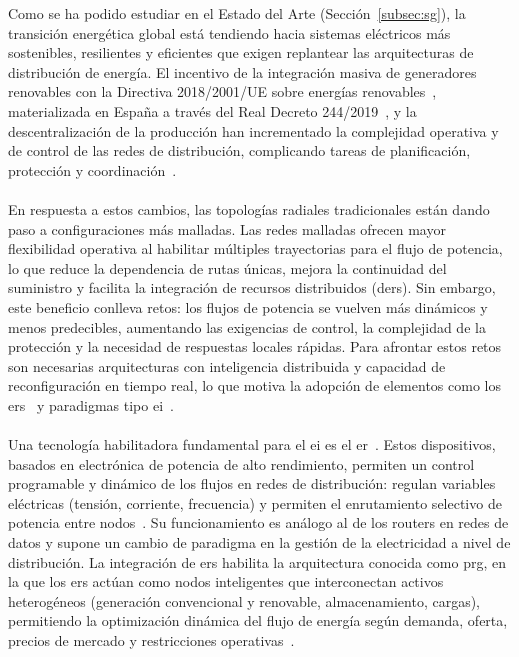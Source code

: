 Como se ha podido estudiar en el Estado del Arte (Sección~\ref{subsec:sg}), la transición energética global está tendiendo hacia sistemas eléctricos más sostenibles, resilientes y eficientes que exigen replantear las arquitecturas de distribución de energía. El incentivo de la integración masiva de generadores renovables con la Directiva 2018/2001/UE sobre energías renovables~\cite{euREDII},  materializada en España a través del Real Decreto 244/2019~\cite{rd2442019}, y la descentralización de la producción han incrementado la complejidad operativa y de control de las redes de distribución, complicando tareas de planificación, protección y coordinación~\cite{GADELHA2024110581}.\\  
\\
En respuesta a estos cambios, las topologías radiales tradicionales están dando paso a configuraciones más malladas. Las redes malladas ofrecen mayor flexibilidad operativa al habilitar múltiples trayectorias para el flujo de potencia, lo que reduce la dependencia de rutas únicas, mejora la continuidad del suministro y facilita la integración de recursos distribuidos (\glspl{der}). Sin embargo, este beneficio conlleva retos: los flujos de potencia se vuelven más dinámicos y menos predecibles, aumentando las exigencias de control, la complejidad de la protección y la necesidad de respuestas locales rápidas. Para afrontar estos retos son necesarias arquitecturas con inteligencia distribuida y capacidad de reconfiguración en tiempo real, lo que motiva la adopción de elementos como los \glspl{er}~\cite{Zhou24} y paradigmas tipo \gls{ei}~\cite{Xu11}.\\
\\
Una tecnología habilitadora fundamental para el \gls{ei} es el \gls{er}~\cite{Zhou24}. Estos dispositivos, basados en electrónica de potencia de alto rendimiento, permiten un control programable y dinámico de los flujos en redes de distribución: regulan variables eléctricas (tensión, corriente, frecuencia) y permiten el enrutamiento selectivo de potencia entre nodos~\cite{Zhu25}. Su funcionamiento es análogo al de los routers en redes de datos y supone un cambio de paradigma en la gestión de la electricidad a nivel de distribución. La integración de \glspl{er} habilita la arquitectura conocida como \gls{prg}, en la que los \glspl{er} actúan como nodos inteligentes que interconectan activos heterogéneos (generación convencional y renovable, almacenamiento, cargas), permitiendo la optimización dinámica del flujo de energía según demanda, oferta, precios de mercado y restricciones operativas~\cite{Liu18}.\\
